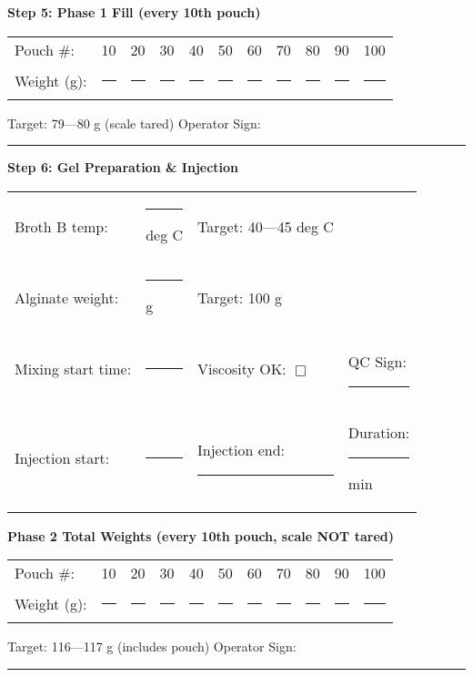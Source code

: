 {\noindent\textbf{Step 5: Phase 1 Fill (every 10th pouch)}

\begin{tabular}{@{}lcccccccccc@{}}
Pouch \#: & 10 & 20 & 30 & 40 & 50 & 60 & 70 & 80 & 90 & 100 \\
Weight (g): & \rule{1cm}{0.4pt} & \rule{1cm}{0.4pt} & \rule{1cm}{0.4pt} & \rule{1cm}{0.4pt} & \rule{1cm}{0.4pt} & \rule{1cm}{0.4pt} & \rule{1cm}{0.4pt} & \rule{1cm}{0.4pt} & \rule{1cm}{0.4pt} & \rule{1cm}{0.4pt} \\
\end{tabular}

\noindent Target: 79---80 g (scale tared) \hspace{2cm} Operator Sign: \rule{3cm}{0.4pt}

\vspace{1em}

\noindent\textbf{Step 6: 
Gel Preparation \& Injection}

\begin{tabular}{@{}lp{3cm}p{3cm}p{3cm}@{}}
Broth B temp: & \rule{2.5cm}{0.4pt} deg C & Target: 40---45 deg C & \\
Alginate weight: & \rule{2.5cm}{0.4pt} g & Target: 100 g & \\
Mixing start time: & \rule{2.5cm}{0.4pt} & Viscosity OK: $\Box$ & QC Sign: \rule{2cm}{0.4pt} \\
Injection start: & \rule{2.5cm}{0.4pt} & Injection end: \rule{2.5cm}{0.4pt} & Duration: \rule{2cm}{0.4pt} min \\
\end{tabular}

\vspace{0.5em}

\noindent\textbf{Phase 2 Total Weights (every 10th pouch, scale NOT tared)}

\begin{tabular}{@{}lcccccccccc@{}}
Pouch \#: & 10 & 20 & 30 & 40 & 50 & 60 & 70 & 80 & 90 & 100 \\
Weight (g): & \rule{1cm}{0.4pt} & \rule{1cm}{0.4pt} & \rule{1cm}{0.4pt} & \rule{1cm}{0.4pt} & \rule{1cm}{0.4pt} & \rule{1cm}{0.4pt} & \rule{1cm}{0.4pt} & \rule{1cm}{0.4pt} 
& \rule{1cm}{0.4pt} & \rule{1cm}{0.4pt} \\
\end{tabular}

\noindent Target: 116---117 g (includes pouch) \hspace{2cm} Operator Sign: \rule{3cm}{0.4pt}

\vspace{1em}

}
